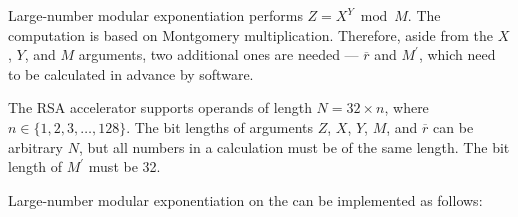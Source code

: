 \documentclass[main\_\_EN.tex]{subfiles}
\begin{document}
Large-number modular exponentiation performs \begin{math}Z = X^{Y} \bmod M\end{math}. The computation is based on Montgomery multiplication. Therefore, aside from the \begin{math}X\end{math},
\begin{math}Y\end{math}, and
\begin{math}M\end{math} arguments, two additional ones are needed --- \begin{math}\overline{r}\end{math} and
\begin{math}M^{\prime}\end{math}, which need to be calculated in advance by software.

The RSA accelerator supports operands of length \begin{math}N = 32 \times n\end{math}, where \begin{math}n \in \{ 1,2,3, \dots, 128\} \end{math}. The bit lengths of arguments \begin{math}Z\end{math}, \begin{math}X\end{math}, \begin{math}Y\end{math}, \begin{math}M\end{math}, and \begin{math}\overline{r}\end{math}
can be arbitrary \begin{math}N\end{math}, but all numbers in a calculation must be of the same length. The bit length of \begin{math}M^{\prime}\end{math} must be 32.

Large-number modular exponentiation on the \chipname{} can be implemented as follows:
\end{document}
